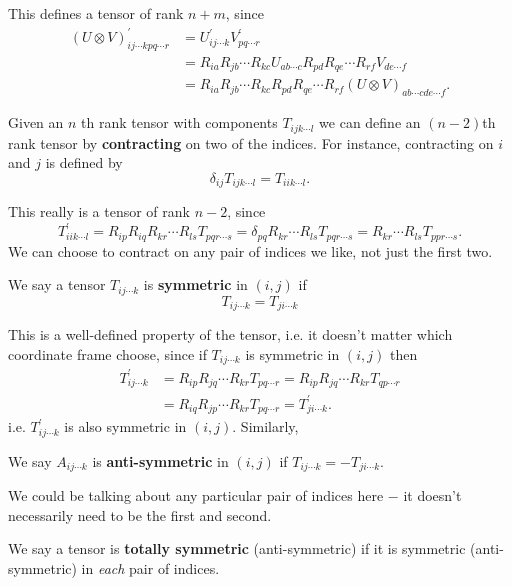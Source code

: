 This defines a tensor of rank $n+m$, since
\[
\begin{aligned}
(U \otimes V)_{i j \cdots k p q \cdots r}^{\prime} &=U_{i j \cdots k}^{\prime} V_{p q \cdots r}^{\prime} \\
&=R_{i a} R_{j b} \cdots R_{k c} U_{a b \cdots c} R_{p d} R_{q e} \cdots R_{r f} V_{d e \cdots f} \\
&=R_{i a} R_{j b} \cdots R_{k c} R_{p d} R_{q e} \cdots R_{r f}(U \otimes V)_{a b \cdots c d e \cdots f} .
\end{aligned}
\]

\begin{definition}
    Given an $n$ th rank tensor with components $T_{i j k \cdots l}$ we can define an $(n-2)$th rank tensor by \textbf{contracting} on two of the indices. For instance, contracting on $i$ and $j$ is defined by
    \[
    \delta_{i j} T_{i j k \cdots l}=T_{i i k \cdots l}.
    \]
\end{definition}

This really is a tensor of rank $n-2$, since
\[
T_{i i k \cdots l}^{\prime}=R_{i p} R_{i q} R_{k r} \cdots R_{l s} T_{p q r \cdots s}=\delta_{p q} R_{k r} \cdots R_{l s} T_{p q r \cdots s}=R_{k r} \cdots R_{l s} T_{p p r \cdots s}.
\]
We can choose to contract on any pair of indices we like, not just the first two.

\begin{definition}
    
We say a tensor $T_{i j \cdots k}$ is \textbf{symmetric} in $(i, j)$ if
$$
T_{i j \cdots k}=T_{j i \cdots k}
$$
\end{definition}
This is a well-defined property of the tensor, i.e. it doesn't matter which coordinate frame choose, since if $T_{i j \cdots k}$ is symmetric in $(i, j)$ then
\begin{align*}
    T_{i j \cdots k}^{\prime}&=R_{i p} R_{j q} \cdots R_{k r} T_{p q \cdots r}=R_{i p} R_{j q} \cdots R_{k r} T_{q p \cdots r}\\&=R_{i q} R_{j p} \cdots R_{k r} T_{p q \cdots r}=T_{j i \cdots k}^{\prime}.
\end{align*}
i.e. $T_{i j \cdots k}^{\prime}$ is also symmetric in $(i, j)$. Similarly,
\begin{definition}
    We say $A_{i j \cdots k}$ is \textbf{anti-symmetric} in $(i, j)$ if $T_{i j \cdots k}=-T_{j i \cdots k} .$
\end{definition}
We could be talking about any particular pair of indices here $-$ it doesn't necessarily need to be the first and second.
\begin{definition}
    We say a tensor is \textbf{totally symmetric} (anti-symmetric) if it is symmetric (anti-symmetric) in \textit{each} pair of indices.
\end{definition}

